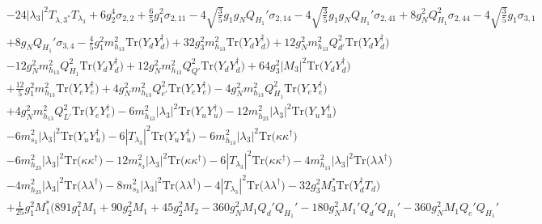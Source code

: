 {\begin{align}
 &-24 |\lambda_3|^2 T_{{\lambda,3}^*} T_{\lambda_3} +6 g_{2}^{4} \sigma_{2,2} +\frac{6}{5} g_{1}^{2} \sigma_{2,11} -4 \sqrt{\frac{3}{5}} g_1 g_N Q_{H_1}' \sigma_{2,14} -4 \sqrt{\frac{3}{5}} g_1 g_N Q_{H_1}' \sigma_{2,41} +8 g_{N}^{2} Q_{H_1}^{2} \sigma_{2,44} -4 \sqrt{\frac{3}{5}} g_1 \sigma_{3,1} \nonumber \\ 
 &+8 g_N Q_{H_1}' \sigma_{3,4} -\frac{4}{5} g_{1}^{2} m_{h_{13}}^2 \mbox{Tr}\Big({Y_d  Y_{d}^{\dagger}}\Big) +32 g_{3}^{2} m_{h_{13}}^2 \mbox{Tr}\Big({Y_d  Y_{d}^{\dagger}}\Big) +12 g_{N}^{2} m_{h_{13}}^2 Q_{d'}^{2} \mbox{Tr}\Big({Y_d  Y_{d}^{\dagger}}\Big) \nonumber \\ 
 &-12 g_{N}^{2} m_{h_{13}}^2 Q_{H_1}^{2} \mbox{Tr}\Big({Y_d  Y_{d}^{\dagger}}\Big) +12 g_{N}^{2} m_{h_{13}}^2 Q_{Q'}^{2} \mbox{Tr}\Big({Y_d  Y_{d}^{\dagger}}\Big) +64 g_{3}^{2} |M_3|^2 \mbox{Tr}\Big({Y_d  Y_{d}^{\dagger}}\Big) \nonumber \\ 
 &+\frac{12}{5} g_{1}^{2} m_{h_{13}}^2 \mbox{Tr}\Big({Y_e  Y_{e}^{\dagger}}\Big) +4 g_{N}^{2} m_{h_{13}}^2 Q_{e'}^{2} \mbox{Tr}\Big({Y_e  Y_{e}^{\dagger}}\Big) -4 g_{N}^{2} m_{h_{13}}^2 Q_{H_1}^{2} \mbox{Tr}\Big({Y_e  Y_{e}^{\dagger}}\Big) \nonumber \\ 
 &+4 g_{N}^{2} m_{h_{13}}^2 Q_{L'}^{2} \mbox{Tr}\Big({Y_e  Y_{e}^{\dagger}}\Big) -6 m_{h_{13}}^2 |\lambda_3|^2 \mbox{Tr}\Big({Y_u  Y_{u}^{\dagger}}\Big) -12 m_{h_{23}}^2 |\lambda_3|^2 \mbox{Tr}\Big({Y_u  Y_{u}^{\dagger}}\Big) \nonumber \\ 
 &-6 m_{s_3}^2 |\lambda_3|^2 \mbox{Tr}\Big({Y_u  Y_{u}^{\dagger}}\Big) -6 |T_{\lambda_3}|^2 \mbox{Tr}\Big({Y_u  Y_{u}^{\dagger}}\Big) -6 m_{h_{13}}^2 |\lambda_3|^2 \mbox{Tr}\Big({\kappa  \kappa^{\dagger}}\Big) \nonumber \\ 
 &-6 m_{h_{23}}^2 |\lambda_3|^2 \mbox{Tr}\Big({\kappa  \kappa^{\dagger}}\Big) -12 m_{s_3}^2 |\lambda_3|^2 \mbox{Tr}\Big({\kappa  \kappa^{\dagger}}\Big) -6 |T_{\lambda_3}|^2 \mbox{Tr}\Big({\kappa  \kappa^{\dagger}}\Big) -4 m_{h_{13}}^2 |\lambda_3|^2 \mbox{Tr}\Big({\lambda  \lambda^{\dagger}}\Big) \nonumber \\ 
 &-4 m_{h_{23}}^2 |\lambda_3|^2 \mbox{Tr}\Big({\lambda  \lambda^{\dagger}}\Big) -8 m_{s_3}^2 |\lambda_3|^2 \mbox{Tr}\Big({\lambda  \lambda^{\dagger}}\Big) -4 |T_{\lambda_3}|^2 \mbox{Tr}\Big({\lambda  \lambda^{\dagger}}\Big) -32 g_{3}^{2} M_3^* \mbox{Tr}\Big({Y_{d}^{\dagger}  T_d}\Big) \nonumber \\ 
 &+\frac{1}{25} g_{1}^{2} M_1^* \Big(891 g_{1}^{2} M_1 +90 g_{2}^{2} M_1 +45 g_{2}^{2} M_2 -360 g_{N}^{2} M_1 Q_d' Q_{H_1}' -180 g_{N}^{2} M_1' Q_d' Q_{H_1}' -360 g_{N}^{2} M_1 Q_e' Q_{H_1}' \nonumber \\ 

\end{align}}
